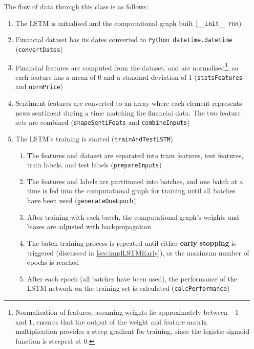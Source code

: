 \documentclass[12pt,a4paper,twoside,openright]{report}
\begin{document}
The flow of data through this class is as follows:

\begin{enumerate}
\item
The LSTM is initialised and the computational graph built (\texttt{\_\_init\_\_} \texttt{rnn})

\item
Financial dataset has its dates converted to \texttt{Python datetime.datetime} (\texttt{convertDates})

\item
Financial features are computed from the dataset, and are normalised\footnote{Normalisation of
features, assuming weights lie approximately between $-1$ and $1$, ensures that the
output of the weight and feature matrix multiplication provides a steep gradient
for training, since the logistic sigmoid function is steepest at $0$.}, so each
feature has a mean of $0$ and a standard deviation of $1$ (\texttt{statsFeatures} and \texttt{normPrice})

\item
Sentiment features are converted to an array where each element
represents news sentiment during a time matching the financial data.
The two feature sets are combined (\texttt{shapeSentiFeats} and \texttt{combineInputs})

\item
The LSTM's training is started (\texttt{trainAndTestLSTM})
\begin{enumerate}
	\item
	The features and dataset are separated into train features,
	test features, train labels, and test labels (\texttt{prepareInputs})
	
	\item
	The features and labels are partitioned into batches, and one
	batch at a time is fed into the computational graph for training
	until all batches have been used (\texttt{generateOneEpoch})
	
	\item
	After training with each batch, the computational graph's weights
	and biases are adjusted with backpropagation
	
	\item
	The batch training process is repeated until either \textbf{early stopping}
	is triggered (discussed in \cref{sec:implLSTMEarly}), or the maximum number of epochs is reached
	
	\item
	After each epoch (all batches have been used), the performance
	of the LSTM network on the training set is calculated (\texttt{calcPerformance})
\end{enumerate}


\end{enumerate}
\end{document}
